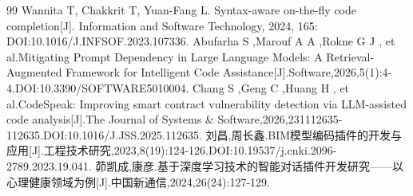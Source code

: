 \begin{thebibliography}{99}
Wannita T, Chakkrit T, Yuan-Fang L. Syntax-aware on-the-fly code completion[J]. Information and Software Technology, 2024, 165: DOI:10.1016/J.INFSOF.2023.107336.
 Abufarha S ,Marouf A A ,Rokne G J , et al.Mitigating Prompt Dependency in Large Language Models: A Retrieval-Augmented Framework for Intelligent Code Assistance[J].Software,2026,5(1):4-4.DOI:10.3390/SOFTWARE5010004.
 Chang S ,Geng C ,Huang H , et al.CodeSpeak: Improving smart contract vulnerability detection via LLM-assisted code analysis[J].The Journal of Systems \& Software,2026,231112635-112635.DOI:10.1016/J.JSS.2025.112635.
 刘昌,周长鑫.BIM模型编码插件的开发与应用[J].工程技术研究,2023,8(19):124-126.DOI:10.19537/j.cnki.2096-2789.2023.19.041.
 茆凯成,康彦.基于深度学习技术的智能对话插件开发研究——以心理健康领域为例[J].中国新通信,2024,26(24):127-129.
\end{thebibliography}
\endgroup
